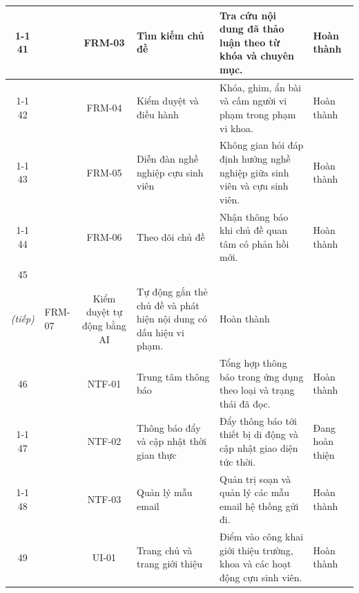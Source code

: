 \documentclass[12pt,a4paper,oneside]{report}
\begin{document}
\begin{landscape}
\begin{longtable}{|c|>{\raggedright\arraybackslash}p{3.1cm}|c|>{\raggedright\arraybackslash}p{4.6cm}|>{\raggedright\arraybackslash}p{8.4cm}|>{\raggedright\arraybackslash}p{2.4cm}|}
\cline{1-1}\cline{3-6}
\cellcolor{oldrow}41 & \cellcolor{oldrow} & \cellcolor{oldrow}FRM-03 & \cellcolor{oldrow}Tìm kiếm chủ đề & \cellcolor{oldrow}Tra cứu nội dung đã thảo luận theo từ khóa và chuyên mục. & \cellcolor{oldrow}Hoàn thành \\
\cline{1-1}\cline{3-6}
\cellcolor{oldrow}42 & \cellcolor{oldrow} & \cellcolor{oldrow}FRM-04 & \cellcolor{oldrow}Kiểm duyệt và điều hành & \cellcolor{oldrow}Khóa, ghim, ẩn bài và cấm người vi phạm trong phạm vi khoa. & \cellcolor{oldrow}Hoàn thành \\
\cline{1-1}\cline{3-6}
\cellcolor{oldrow}43 & \cellcolor{oldrow} & \cellcolor{oldrow}FRM-05 & \cellcolor{oldrow}Diễn đàn nghề nghiệp cựu sinh viên & \cellcolor{oldrow}Không gian hỏi đáp định hướng nghề nghiệp giữa sinh viên và cựu sinh viên. & \cellcolor{oldrow}Hoàn thành \\
\cline{1-1}\cline{3-6}
\cellcolor{oldrow}44 & \multirow{-6}{2.4cm}{\cellcolor{oldrow}\textbf{Diễn đàn}} & \cellcolor{oldrow}FRM-06 & \cellcolor{oldrow}Theo dõi chủ đề & \cellcolor{oldrow}Nhận thông báo khi chủ đề quan tâm có phản hồi mới. & \cellcolor{oldrow}Hoàn thành \\
\hline
\cellcolor{oldrow}45 & \multirow{-1}{2.4cm}{\cellcolor{oldrow}\textbf{Diễn đàn\\\textit{(tiếp)}}} & \cellcolor{oldrow}FRM-07 & \cellcolor{oldrow}Kiểm duyệt tự động bằng AI & \cellcolor{oldrow}Tự động gắn thẻ chủ đề và phát hiện nội dung có dấu hiệu vi phạm. & \cellcolor{oldrow}Hoàn thành \\
\hline
\cellcolor{oldrow}46 & \cellcolor{oldrow} & \cellcolor{oldrow}NTF-01 & \cellcolor{oldrow}Trung tâm thông báo & \cellcolor{oldrow}Tổng hợp thông báo trong ứng dụng theo loại và trạng thái đã đọc. & \cellcolor{oldrow}Hoàn thành \\
\cline{1-1}\cline{3-6}
\cellcolor{oldrow}47 & \cellcolor{oldrow} & \cellcolor{oldrow}NTF-02 & \cellcolor{oldrow}Thông báo đẩy và cập nhật thời gian thực & \cellcolor{oldrow}Đẩy thông báo tới thiết bị di động và cập nhật giao diện tức thời. & \cellcolor{oldrow}Đang hoàn thiện \\
\cline{1-1}\cline{3-6}
\cellcolor{oldrow}48 & \multirow{-3}{2.4cm}{\cellcolor{oldrow}\textbf{Thông báo}} & \cellcolor{oldrow}NTF-03 & \cellcolor{oldrow}Quản lý mẫu email & \cellcolor{oldrow}Quản trị soạn và quản lý các mẫu email hệ thống gửi đi. & \cellcolor{oldrow}Hoàn thành \\
\hline
\cellcolor{oldrow}49 & \cellcolor{oldrow} & \cellcolor{oldrow}UI-01 & \cellcolor{oldrow}Trang chủ và trang giới thiệu & \cellcolor{oldrow}Điểm vào công khai giới thiệu trường, khoa và các hoạt động cựu sinh viên. & \cellcolor{oldrow}Hoàn thành \\

\end{longtable}
\end{landscape}
\end{document}
